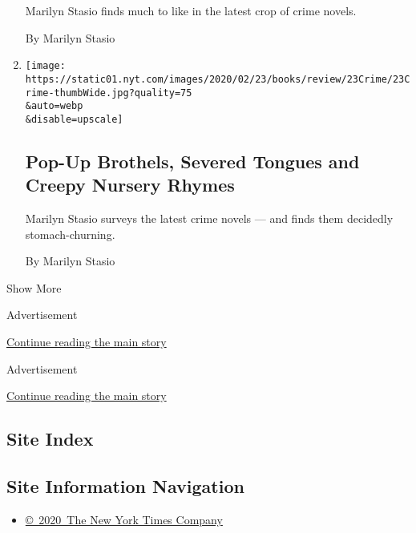 \begin{enumerate}
  Marilyn Stasio finds much to like in the latest crop of crime novels.

  By Marilyn Stasio
\item
  \href{/2020/02/20/books/review/crime-fiction-stasio.html}{}

  \texttt{[image: https://static01.nyt.com/images/2020/02/23/books/review/23Crime/23Crime-thumbWide.jpg?quality=75\\\&auto=webp\\\&disable=upscale]}

  \hypertarget{pop-up-brothels-severed-tongues-and-creepy-nursery-rhymes}{%
  \subsection{Pop-Up Brothels, Severed Tongues and Creepy Nursery
  Rhymes}\label{pop-up-brothels-severed-tongues-and-creepy-nursery-rhymes}}

  Marilyn Stasio surveys the latest crime novels --- and finds them
  decidedly stomach-churning.

  By Marilyn Stasio
\end{enumerate}

Show More

Advertisement

\protect\hyperlink{after-mid1}{Continue reading the main story}

Advertisement

\protect\hyperlink{after-mktg}{Continue reading the main story}

\hypertarget{site-index}{%
\subsection{Site Index}\label{site-index}}

\hypertarget{site-information-navigation}{%
\subsection{Site Information
Navigation}\label{site-information-navigation}}

\begin{itemize}
\tightlist
\item
  \href{https://help.nytimes.com/hc/en-us/articles/115014792127-Copyright-notice}{©~2020~The
  New York Times Company}
\end{itemize}

